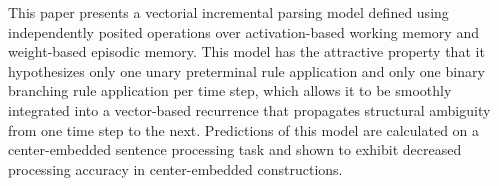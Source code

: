 This paper presents a vectorial incremental parsing model defined using independently posited operations over activation-based working memory and weight-based episodic memory.  This model has the attractive property that it hypothesizes only one unary preterminal rule application and only one binary branching rule application per time step, which allows it to be smoothly integrated into a vector-based recurrence that propagates structural ambiguity from one time step to the next.  Predictions of this model are calculated on a center-embedded sentence processing task and shown to exhibit decreased processing accuracy in center-embedded constructions.
